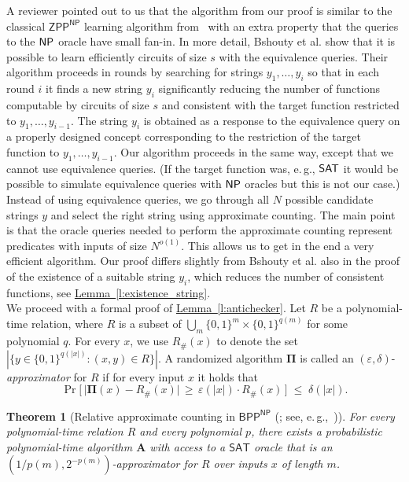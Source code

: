 \documentclass[11pt]{article}
\numberwithin{equation}{section}
\newtheorem{theorem}{Theorem}[section]
\theoremstyle{definition}
\theoremstyle{plain}
\newcommand{\eg}{e.\,g.}
\newcommand{\expref}[2]{\hyperref[#2]{#1~\ref{#2}}}
\newcommand{\NP}{\ensuremath{{\sf NP}}\xspace}
\newcommand{\SAT}{\ensuremath{{\sf SAT}}\xspace}
\begin{document}
 A reviewer pointed out to us that the algorithm from our proof is %
similar to the classical $\mathsf{ZPP}^{\mathsf{NP}}$ learning algorithm from~\cite{DBLP:journals/jcss/BshoutyCGKT96} with an extra property that the queries to the \NP oracle have small fan-in. In more detail, Bshouty et al. show that it is possible to learn efficiently circuits of size $s$ with the equivalence queries. Their algorithm proceeds in rounds by searching for strings $y_1,\dots,y_i$ so that in each round $i$ it finds a new string $y_i$ significantly reducing the number of functions computable by circuits of size $s$ and consistent with the target function restricted to $y_1,\dots,y_{i-1}$. The string $y_i$ is obtained as a response to the equivalence query on a properly designed concept corresponding to the restriction of the target function to $y_1,\dots,y_{i-1}$. Our algorithm proceeds in the same way, except that we cannot use equivalence queries. (If the target function was, \eg, \SAT it would be possible to simulate equivalence queries with \NP oracles but this is not our case.) Instead of using equivalence queries, we go through all $N$ possible candidate strings $y$ and select the right string using approximate counting. The main point is that the oracle queries needed to perform the approximate counting represent predicates with inputs of size $N^{o(1)}$. This allows us to get in the end a very efficient algorithm. Our proof differs slightly from Bshouty et al. also in the proof of the existence of a suitable string $y_i$, which reduces the number of consistent functions, see \expref{Lemma}{l:existence_string}. \\


We proceed with a formal proof of \expref{Lemma}{l:antichecker}. Let $R$ be a polynomial-time relation, where
%
%
%
$R$ is a subset of $\bigcup_m \{0,1\}^m \times \{0,1\}^{q(m)}$  %
for some polynomial $q$. For every $x$, we use $R_{\#}(x)$ to denote
the set  %
$|\{y \in \{0,1\}^{q(|x|)} \colon (x,y) \in R\}|$. A randomized algorithm $\bm{\Pi}$ is called an $(\varepsilon, \delta)$-\emph{approximator} for $R$ if for every input $x$ it holds that
$$
\Pr \! \big [\,\big|\bm{\Pi}(x) - R_{\#}(x)\big| \,\geq\, \varepsilon(|x|) \cdot R_{\#}(x)\, \big ] \;\leq\; \delta(|x|).
$$

\begin{theorem}[Relative approximate counting in $\mathsf{BPP}^\mathsf{NP}$ (\cite{DBLP:conf/stoc/Stockmeyer83}; see, \eg,~{\cite[Section~6.2.2]{DBLP:books/daglib/0019967}})] \label{thm:rel_counting}
For every polynomial-time relation $R$ and every polynomial $p$, there exists a probabilistic polynomial-time algorithm $\bm{A}$ with access to a $\mathsf{SAT}$ oracle that is an $(1/p(m), 2^{-p(m)})$-approximator for $R$ over inputs $x$ of length $m$.
\end{theorem}
\end{document}
